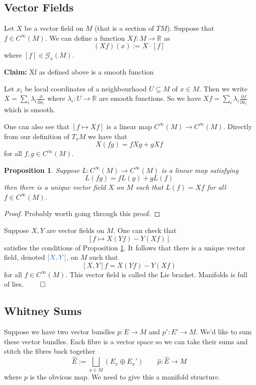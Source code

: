 \documentclass[11pt]{article}
\newcommand{\defeq}{:=}
\newcommand{\R}{\mathbb{R}}
\newcommand*{\pd}[3][]{\ensuremath{\frac{\partial^{#1} {#2}}{\partial {#3}^{#1}}}}
\newenvironment{defin}
	{\begin{mdframed}[backgroundcolor=white, roundcorner=5pt, linewidth=1pt, linecolor=RoyalBlue]
		\setlength{\parindent}{0pt}}
	{\end{mdframed}}
\newcommand{\mdf}[1]{{\color{RoyalBlue} #1}}
\newtheorem{prop}[theorem]{Proposition}
\begin{document}
\subsection{Vector Fields}

Let $X$ be a vector field on $M$ (that is a section of $TM$).
Suppose that $f\in C^\infty(M)$.
We can define a function $Xf:M\to \R$ as
\[
	(Xf)(x)\defeq X\cdot [f]
\]
where $[f]\in\mathcal{G}_x(M)$.

\noindent\textbf{Claim: }Xf as defined above is a smooth function

Let $x_i$ be local coordinates of a neighbourhood $U\subseteq M$ of $x\in M$.
Then we write $X=\sum_{i}\lambda_i \pd{}{x_i}$ where $\lambda_i: U \to \R$ are smooth functions.
So we have $Xf=\sum_{i}\lambda_i \pd{f}{x_i}$ which is smooth.

One can also see that $[f \mapsto Xf]$ is a linear map $C^\infty(M)\to C^\infty (M)$.
Directly from our definition of $T_xM$ we have that
\[
	X(fg) = fXg + gXf
\]
for all $f,g \in C^\infty(M)$.

\begin{prop}
\label{pr:LtoX}
Suppose $L:C^\infty(M)\to C^\infty(M)$ is a linear map satisfying
\[
	L(fg) = fL(g) + gL(f)
\]
then there is a unique vector field $X$ on $M$ such that $L(f)=Xf$ for all $f\in C^\infty(M)$.
\end{prop}

\begin{proof}
Probably worth going through this proof.
\end{proof}

\begin{defin}
	Suppose $X, Y$ are vector fields on $M$.	
	One can check that
	\[
		[f \mapsto X(Yf) - Y(Xf)]
	\]
	satisfies the conditions of Proposition \ref{pr:LtoX}.
	It follows that there is a unique vector field, denoted $\mdf{[X, Y]}$, on $M$ such that
	\[
		[X, Y]f = X(Yf) - Y(Xf)
	\]
	for all $f\in C^\infty(M)$.
	This vector field is called the \mdf{Lie bracket}.
	Manifolds is full of lies. $\qed$ 
\end{defin}

\subsection{Whitney Sums}
Suppose we have two vector bundles
$p:E \to M$ and $p':E'\to M$.
We'd like to sum these vector bundles.
Each fibre is a vector space so we can take their sums and stitch the fibres back together
\[
	\hat{E} \defeq \bigsqcup_{x\in M}(E_x \oplus E_x')\quad\quad \hat{p}:\hat{E}\to M
\]
where $\hat{p}$ is the obvious map.
We need to give this a manifold structure.
\end{document}
